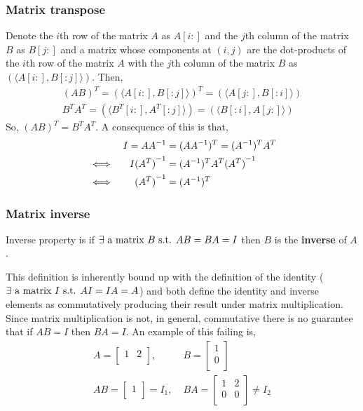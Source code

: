 \documentclass[MathsNotesBase.tex]{subfiles}
\begin{document}
{		\bigskip
		\subsubsection*{Matrix transpose}
		Denote the $i$th row of the matrix $A$ as $A[i:]$ and the $j$th column of the matrix $B$ as $B[j:]$ and a matrix whose components at $(i,j)$ are the dot-products of the $i$th row of the matrix $A$ with the $j$th column of the matrix $B$ as $(\langle A[i:], B[:j] \rangle)$. Then,
		\begin{align*}
		(AB)^{T} = (\langle A[i:], B[:j] \rangle)^{T} = (\langle A[j:], B[:i] \rangle) \\
		B^{T}A^{T} = (\langle B^{T}[i:], A^{T}[:j] \rangle) = (\langle B[:i], A[j:] \rangle)
		\end{align*}
		So, $(AB)^{T} = B^{T}A^{T}$. A consequence of this is that,
		\begin{align*}
		&& I = A{A}^{-1} &= (AA^{-1})^{T} = (A^{-1})^{T}A^{T} \\
		& \iff & I{(A^{T})}^{-1} &= (A^{-1})^{T}A^{T}{(A^{T})}^{-1} \\
		& \iff & {(A^{T})}^{-1} &= (A^{-1})^{T}
		\end{align*}
		
		\bigskip
		\subsubsection*{Matrix inverse}
		\begin{definition}
		Inverse property is if $ \exists \text{ a matrix } B \text{ s.t. } AB = BA = I $ then $B$ is the \textbf{inverse} of $A$.
		\end{definition}
		This definition is inherently bound up with the definition of the identity ($\exists \text{ a matrix } I \text{ s.t. } AI = IA = A$) and both define the identity and inverse elements as commutatively producing their result under matrix multiplication. Since matrix multiplication is not, in general, commutative there is no guarantee that if $AB = I$ then $BA = I$. An example of this failing is,
		\begin{align*}
			A = 
			\begin{bmatrix}
			1 & 2 \\
			\end{bmatrix},\;
			&B =
			\begin{bmatrix}
			1 \\
			0 \\
			\end{bmatrix}
			\\[10pt]
			AB = 
			\begin{bmatrix}
			1 \\
			\end{bmatrix} = I_1,\;
			&BA =
			\begin{bmatrix}
			1 & 2 \\
			0 & 0 \\
			\end{bmatrix} \neq I_2
		\end{align*}
		
}
\end{document}

